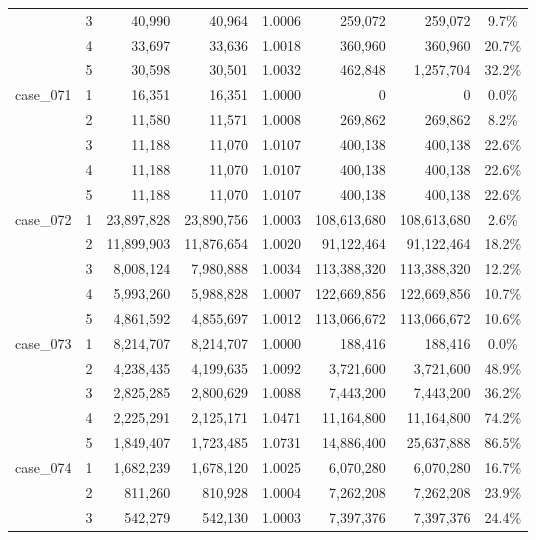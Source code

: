\begin{footnotesize}
\begin{longtable}{l c rr c rr c}
 & 3 & 40{,}990 & 40{,}964 & 1.0006 & 259{,}072 & 259{,}072 & 9.7\% \\
 & 4 & 33{,}697 & 33{,}636 & 1.0018 & 360{,}960 & 360{,}960 & 20.7\% \\
 & 5 & 30{,}598 & 30{,}501 & 1.0032 & 462{,}848 & 1{,}257{,}704 & 32.2\% \\
\addlinespace[2pt]
case\_071 & 1 & 16{,}351 & 16{,}351 & 1.0000 & 0 & 0 & 0.0\% \\
 & 2 & 11{,}580 & 11{,}571 & 1.0008 & 269{,}862 & 269{,}862 & 8.2\% \\
 & 3 & 11{,}188 & 11{,}070 & 1.0107 & 400{,}138 & 400{,}138 & 22.6\% \\
 & 4 & 11{,}188 & 11{,}070 & 1.0107 & 400{,}138 & 400{,}138 & 22.6\% \\
 & 5 & 11{,}188 & 11{,}070 & 1.0107 & 400{,}138 & 400{,}138 & 22.6\% \\
\addlinespace[2pt]
case\_072 & 1 & 23{,}897{,}828 & 23{,}890{,}756 & 1.0003 & 108{,}613{,}680 & 108{,}613{,}680 & 2.6\% \\
 & 2 & 11{,}899{,}903 & 11{,}876{,}654 & 1.0020 & 91{,}122{,}464 & 91{,}122{,}464 & 18.2\% \\
 & 3 & 8{,}008{,}124 & 7{,}980{,}888 & 1.0034 & 113{,}388{,}320 & 113{,}388{,}320 & 12.2\% \\
 & 4 & 5{,}993{,}260 & 5{,}988{,}828 & 1.0007 & 122{,}669{,}856 & 122{,}669{,}856 & 10.7\% \\
 & 5 & 4{,}861{,}592 & 4{,}855{,}697 & 1.0012 & 113{,}066{,}672 & 113{,}066{,}672 & 10.6\% \\
\addlinespace[2pt]
case\_073 & 1 & 8{,}214{,}707 & 8{,}214{,}707 & 1.0000 & 188{,}416 & 188{,}416 & 0.0\% \\
 & 2 & 4{,}238{,}435 & 4{,}199{,}635 & 1.0092 & 3{,}721{,}600 & 3{,}721{,}600 & 48.9\% \\
 & 3 & 2{,}825{,}285 & 2{,}800{,}629 & 1.0088 & 7{,}443{,}200 & 7{,}443{,}200 & 36.2\% \\
 & 4 & 2{,}225{,}291 & 2{,}125{,}171 & 1.0471 & 11{,}164{,}800 & 11{,}164{,}800 & 74.2\% \\
 & 5 & 1{,}849{,}407 & 1{,}723{,}485 & 1.0731 & 14{,}886{,}400 & 25{,}637{,}888 & 86.5\% \\
\addlinespace[2pt]
case\_074 & 1 & 1{,}682{,}239 & 1{,}678{,}120 & 1.0025 & 6{,}070{,}280 & 6{,}070{,}280 & 16.7\% \\
 & 2 & 811{,}260 & 810{,}928 & 1.0004 & 7{,}262{,}208 & 7{,}262{,}208 & 23.9\% \\
 & 3 & 542{,}279 & 542{,}130 & 1.0003 & 7{,}397{,}376 & 7{,}397{,}376 & 24.4\% \\

\end{longtable}
\end{footnotesize}

